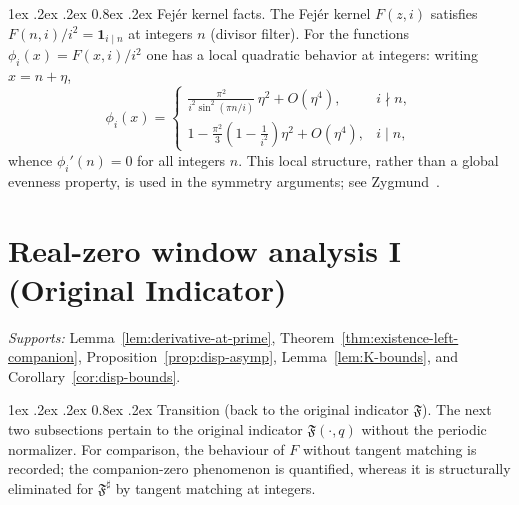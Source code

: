 \documentclass[11pt,a4paper]{amsart}
\makeatletter
\newcommand{\F}{F}
\newcommand{\Fbase}{\mathfrak F}
\newcommand{\Fsharp}{\Fbase^{\sharp}}
\renewcommand\paragraph{\@startsection{paragraph}{4}{\z@}%
  {1ex \@plus .2ex \@minus .2ex}%
  {0.8ex \@plus .2ex}%
  {\normalfont\bfseries}}
\theoremstyle{plain}
\theoremstyle{definition}
\theoremstyle{remark}
\makeatother
\begin{document}
\paragraph{Fejér kernel facts.}
The Fejér kernel $F(z,i)$ satisfies $F(n,i)/i^2=\mathbf 1_{i\mid n}$ at integers $n$ (divisor filter). For the functions $\phi_i(x)=F(x,i)/i^2$ one has a local quadratic behavior at integers: writing $x=n+\eta$,
\[
\phi_i(x)=
\begin{cases}
\displaystyle \frac{\pi^2}{i^2\sin^2(\pi n/i)}\,\eta^2+O(\eta^4), & i\nmid n,\\[1ex]
\displaystyle 1-\frac{\pi^2}{3}\!\left(1-\frac{1}{i^2}\right)\eta^2+O(\eta^4), & i\mid n,
\end{cases}
\]
whence $\phi_i'(n)=0$ for all integers $n$. This local structure, rather than a global evenness property, is used in the symmetry arguments; see Zygmund~\cite{zygmund2002}.

\bigskip

\section{Real-zero window analysis I (Original Indicator)}\label{app:real-zero-original}
\noindent\textit{Supports:} Lemma~\ref{lem:derivative-at-prime}, Theorem~\ref{thm:existence-left-companion}, Proposition~\ref{prop:disp-asymp}, Lemma~\ref{lem:K-bounds}, and Corollary~\ref{cor:disp-bounds}.

\paragraph{Transition (back to the original indicator $\mathfrak F$).}
The next two subsections pertain to the original indicator $\mathfrak F(\cdot,q)$ without the periodic normalizer. 
For comparison, the behaviour of $\F$ without tangent matching is recorded; the companion-zero phenomenon is quantified, whereas it is structurally eliminated for $\Fsharp$ by tangent matching at integers.
\end{document}
